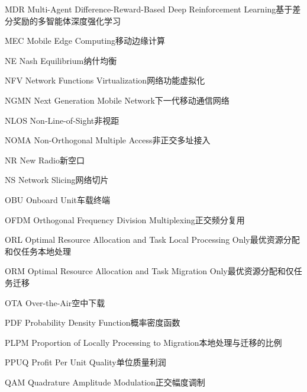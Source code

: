 \begin{abbreviate}[0mm][18mm]
\item[MDR] Multi-Agent Difference-Reward-Based Deep Reinforcement Learning\hspace{1em}基于差分奖励的多智能体深度强化学习
\item[MEC] Mobile Edge Computing\hspace{1em}移动边缘计算
\item[NE] Nash Equilibrium\hspace{1em}纳什均衡
\item[NFV] Network Functions Virtualization\hspace{1em}网络功能虚拟化
\item[NGMN] Next Generation Mobile Network\hspace{1em}下一代移动通信网络
\item[NLOS] Non-Line-of-Sight\hspace{1em}非视距
\item[NOMA] Non-Orthogonal Multiple Access\hspace{1em}非正交多址接入
\item[NR] New Radio\hspace{1em}新空口
\item[NS] Network Slicing\hspace{1em}网络切片
\item[OBU] Onboard Unit\hspace{1em}车载终端
\item[OFDM] Orthogonal Frequency Division Multiplexing\hspace{1em}正交频分复用
\item[ORL] Optimal Resource Allocation and Task Local Processing Only\hspace{1em}最优资源分配和仅任务本地处理
\item[ORM] Optimal Resource Allocation and Task Migration Only\hspace{1em}最优资源分配和仅任务迁移
\item[OTA] Over-the-Air\hspace{1em}空中下载
\item[PDF] Probability Density Function\hspace{1em}概率密度函数
\item[PLPM] Proportion of Locally Processing to Migration\hspace{1em}本地处理与迁移的比例
\item[PPUQ] Proﬁt Per Unit Quality\hspace{1em}单位质量利润
\item[QAM] Quadrature Amplitude Modulation\hspace{1em}正交幅度调制

\end{abbreviate}
